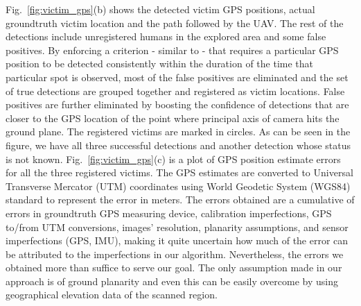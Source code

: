 \documentclass[runningheads]{llncs}
\begin{document}
Fig.~\ref{fig:victim_gps}(b) shows the detected victim GPS positions, actual groundtruth victim location and the path followed by the UAV. The rest of the detections include unregistered humans in the explored area and some false positives. By enforcing a criterion - similar to \cite{rudol2008human} - that requires a particular GPS position to be detected consistently within the duration of the time that particular spot is observed, most of the false positives are eliminated and the set of true detections are grouped together and registered as victim locations. False positives are further eliminated by boosting the confidence of detections that are closer to the GPS location of the point where principal axis of camera hits the ground plane. The registered victims are marked in circles. As can be seen in the figure, we have all three successful detections and another detection whose status is not known. Fig.~\ref{fig:victim_gps}(c) is a plot of GPS position estimate errors for all the three registered victims. The GPS estimates are converted to Universal Transverse Mercator (UTM) coordinates using World Geodetic System (WGS84) standard \cite{WGS} to represent the error in meters. The errors obtained are a cumulative of errors in groundtruth GPS measuring device, calibration imperfections, GPS to/from UTM conversions, images' resolution, planarity assumptions, and sensor imperfections (GPS, IMU), making it quite uncertain how much of the error can be attributed to the imperfections in our algorithm. Nevertheless, the errors we obtained more than suffice to serve our goal. The only assumption made in our approach is of ground planarity and even this can be easily overcome by using geographical elevation data of the scanned region.
\end{document}
